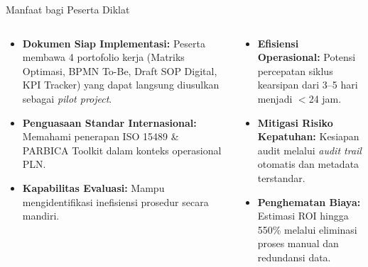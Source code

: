 \documentclass[aspectratio=169,11pt]{beamer}
\begin{document}
\begin{frame}{Manfaat bagi Peserta Diklat}
    \vspace{0.2cm}
    \begin{columns}[T]
        \begin{premiumbox}
            \small
            \begin{itemize}
                \item \textbf{Dokumen Siap Implementasi:} Peserta membawa 4 portofolio kerja (Matriks Optimasi, BPMN To-Be, Draft SOP Digital, KPI Tracker) yang dapat langsung diusulkan sebagai \textit{pilot project}.
                \item \textbf{Penguasaan Standar Internasional:} Memahami penerapan ISO 15489 \& PARBICA Toolkit dalam konteks operasional PLN.
                \item \textbf{Kapabilitas Evaluasi:} Mampu mengidentifikasi inefisiensi prosedur secara mandiri.
            \end{itemize}
        \end{premiumbox}
        
        \begin{orangebox}
            \small
            \begin{itemize}
                \item \textbf{Efisiensi Operasional:} Potensi percepatan siklus kearsipan dari 3--5 hari menjadi $<$24 jam.
                \item \textbf{Mitigasi Risiko Kepatuhan:} Kesiapan audit melalui \textit{audit trail} otomatis dan metadata terstandar.
                \item \textbf{Penghematan Biaya:} Estimasi ROI hingga 550\% melalui eliminasi proses manual dan redundansi data.
            \end{itemize}
        \end{orangebox}
    \end{columns}
\end{frame}
\end{document}
